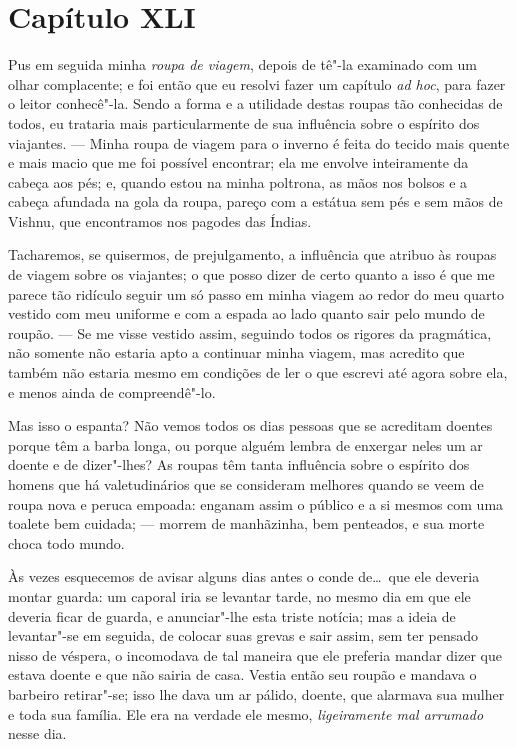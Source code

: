 \section*{Capítulo XLI}

 Pus em seguida minha\textit{ roupa de viagem}, depois de tê"-la
examinado com um olhar complacente; e foi então que eu resolvi fazer um
capítulo \textit{ad hoc}, para fazer o leitor conhecê"-la. Sendo a forma
e a utilidade destas roupas tão conhecidas de todos, eu trataria mais
particularmente de sua influência sobre o espírito dos viajantes. ---
Minha roupa de viagem para o inverno é feita do tecido mais quente e
mais macio que me foi possível encontrar; ela me envolve inteiramente
da cabeça aos pés; e, quando estou na minha poltrona, as mãos nos
bolsos e a cabeça afundada na gola da roupa, pareço com a estátua sem
pés e sem mãos de Vishnu, que encontramos nos pagodes das
Índias. 

 Tacharemos, se quisermos, de prejulgamento, a influência que atribuo às
roupas de viagem sobre os viajantes; o que posso dizer de certo quanto
a isso é que me parece tão ridículo seguir um só passo em minha viagem
ao redor do meu quarto vestido com meu uniforme e com a espada ao lado
quanto sair pelo mundo de roupão. --- Se me visse vestido assim,
seguindo todos os rigores da pragmática, não somente não estaria apto a
continuar minha viagem, mas acredito que também não estaria mesmo em
condições de ler o que escrevi até agora sobre ela, e menos ainda de
compreendê"-lo.

 Mas isso o espanta? Não vemos todos os dias pessoas que se acreditam
doentes porque têm a barba longa, ou porque alguém lembra de enxergar
neles um ar doente e de dizer"-lhes? As roupas têm tanta influência
sobre o espírito dos homens que há valetudinários que se consideram
melhores quando se veem de roupa nova e peruca empoada: enganam assim o
público e a si mesmos com uma toalete bem cuidada; --- morrem de
manhãzinha, bem penteados, e sua morte choca todo mundo.

 Às vezes esquecemos de avisar alguns dias antes o conde de\ldots\ que ele
deveria montar guarda: um caporal iria se levantar tarde, no mesmo dia
em que ele deveria ficar de guarda, e anunciar"-lhe esta triste notícia;
mas a ideia de levantar"-se em seguida, de colocar suas grevas e sair
assim, sem ter pensado nisso de véspera, o incomodava de tal maneira
que ele preferia mandar dizer que estava doente e que não sairia de
casa. Vestia então seu roupão e mandava o barbeiro retirar"-se; isso lhe
dava um ar pálido, doente, que alarmava sua mulher e toda sua família.
Ele era na verdade ele mesmo, \textit{ligeiramente mal arrumado} nesse dia. 

